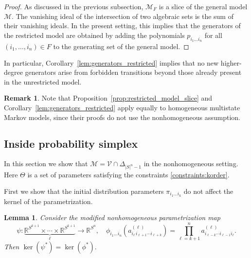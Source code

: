 \documentclass[11pt, a4paper]{article}
\numberwithin{equation}{section}
\theoremstyle{plain}
\newtheorem{lemma}[theorem]{Lemma}
\theoremstyle{definition}
\newtheorem{remark}[theorem]{Remark}
\begin{document}
\begin{proof}
As discussed in the previous subsection, $\mathcal{M}_F$ is a slice of the general model $\mathcal{M}$. 
The vanishing ideal of the intersection of two algebraic sets is the sum of their vanishing ideals. 
In the present setting, this implies that the generators of the restricted model are obtained by 
adding the polynomials   $p_{i_1 \ldots i_n}$  for all $(i_1,\ldots,i_n) \in F$ to the generating set of the general model. 
\end{proof}

In particular, Corollary~\ref{lem:generators_restricted} implies that no new higher-degree generators arise from forbidden transitions beyond those
already present in the unrestricted model.

\begin{remark}
Note that Proposition~\ref{prop:restricted_model_slice} and  Corollary~\ref{lem:generators_restricted}
apply equally to homogeneous multistate Markov models, since their proofs
do not use the nonhomogeneous assumption. 
\end{remark}

\subsection{Inside probability simplex} \label{sec:summing_to_one_condition}

In this section we show that $\mathcal{M} =\mathcal{V} \cap \Delta_{|S|^n-1}$ in the nonhomogeneous setting. Here $\Theta$ is a set of parameters satisfying the constraints \eqref{constraints:korder}.



First we show that the initial distribution parameters $\pi_{i_1 \ldots i_k}$
do not affect the kernel of the parametrization.

\begin{lemma}
\label{lem:reparametrization}
Consider the modified nonhomogeneous parametrization map
\[
\psi:  \underbrace{\mathbb{R}^{S^{k+1}} \times \cdots \times \mathbb{R}^{S^{k+1}}}_{\ell} \rightarrow \mathbb{R}^{S^n}, \quad \phi_{i_1 \ldots i_n}(
a^{(\ell)}_{i_{\ell}\, i_{\ell+1}\cdots i_{\ell+k}}) =\prod_{\ell=k+1}^n a^{(\ell)}_{i_{\ell-k}\cdots i_{\ell-1} i_{\ell}}.
\]
Then
$\ker(\psi^*) = \ker(\phi^*).$
\end{lemma}
\end{document}
